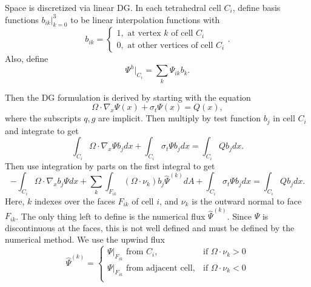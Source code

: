 \documentclass[12pt,letterpaper]{article}
\begin{document}
Space is discretized via linear DG.
In each tetrahedral cell $C_i$, define basis functions $b_{ik}|_{k=0}^3$ to be linear interpolation functions with 
\begin{equation}
b_{ik} = \begin{cases}
1, \textrm{ at vertex } k \textrm{ of cell } C_i \\
0, \textrm{ at other vertices of cell } C_i
\end{cases}.
\end{equation}
Also, define 
\begin{equation}
\Psi^h|_{C_i} = \sum_k \Psi_{ik} b_k.
\end{equation}

Then the DG formulation is derived by starting with the equation
\begin{equation} \label{eq:sweep}
\Omega \cdot \nabla_x \Psi(x) + \sigma_t \Psi(x) = Q(x),
\end{equation}
where the subscripts $q,g$ are implicit.
Then multiply by test function $b_j$ in cell $C_i$ and integrate to get
\begin{equation}
\int_{C_i} \Omega \cdot \nabla_x \Psi b_j dx + \int_{C_i} \sigma_t \Psi b_j dx = \int_{C_i} Q b_j dx.
\end{equation}
Then use integration by parts on the first integral to get
\begin{equation}
-\int_{C_i} \Omega \cdot \nabla_x b_j \Psi dx + 
\sum_k \int_{F_{ik}} (\Omega \cdot \nu_k) b_j \hat{\Psi}^{(k)} dA + 
\int_{C_i} \sigma_t \Psi b_j dx = \int_{C_i} Q b_j dx.
\end{equation}
Here, $k$ indexes over the faces $F_{ik}$ of cell $i$, and $\nu_k$ is the outward normal to face $F_{ik}$.
The only thing left to define is the numerical flux $\hat{\Psi}^{(k)}$.
Since $\Psi$ is discontinuous at the faces, this is not well defined and must be defined by the numerical method.
We use the upwind flux
\begin{equation}
\hat{\Psi}^{(k)} = \begin{cases}
\Psi|_{F_{ik}} \textrm{ from } C_{i}, & \textrm{if } \Omega \cdot \nu_k > 0 \\
\Psi|_{F_{ik}} \textrm{ from adjacent cell} , & \textrm{if } \Omega \cdot \nu_k < 0 \\
\end{cases}
\end{equation}
\end{document}

